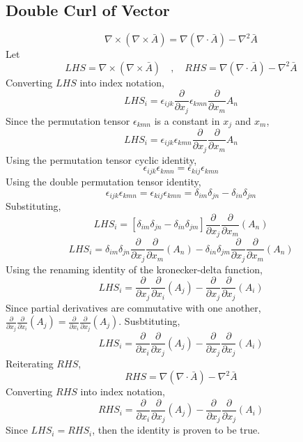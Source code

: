 \subsection{Double Curl of Vector}
\begin{comment}
\end{comment}

$$\nabla\times\left(\nabla\times\bar{A}\right) = \nabla\left(\nabla \cdot\bar{A}\right) - \nabla^{2}\bar{A}$$
Let 
$$LHS = \nabla\times\left(\nabla\times\bar{A}\right) \quad,\quad RHS = \nabla\left(\nabla \cdot\bar{A}\right) - \nabla^{2}\bar{A}$$
Converting $LHS$ into index notation,
$$LHS_{i} = \epsilon_{ijk}\frac{\partial}{\partial x_{j}}\epsilon_{kmn}\frac{\partial}{\partial x_{m}}A_{n}$$
Since the permutation tensor $\epsilon_{kmn}$ is a constant in $x_{j}$ and $x_{m}$,
$$LHS_{i} = \epsilon_{ijk}\epsilon_{kmn}\frac{\partial}{\partial x_{j}}\frac{\partial}{\partial x_{m}}A_{n}$$
Using the permutation tensor cyclic identity,
$$\epsilon_{ijk}\epsilon_{kmn} = \epsilon_{kij}\epsilon_{kmn}$$
Using the double permutation tensor identity,
$$\epsilon_{ijk}\epsilon_{kmn} = \epsilon_{kij}\epsilon_{kmn} = \delta_{im}\delta_{jn}-\delta_{in}\delta_{jm}$$
Substituting,
$$LHS_{i} = [\delta_{im}\delta_{jn}-\delta_{in}\delta_{jm}]\frac{\partial}{\partial x_{j}}\frac{\partial}{\partial x_{m}}(A_{n})$$
$$LHS_{i} =  \delta_{im}\delta_{jn}\frac{\partial}{\partial x_{j}}\frac{\partial}{\partial x_{m}}(A_{n})-\delta_{in}\delta_{jm}\frac{\partial}{\partial x_{j}}\frac{\partial}{\partial x_{m}}(A_{n}) $$
Using the renaming identity of the kronecker-delta function,
$$LHS_{i} =  \frac{\partial}{\partial x_{j}}\frac{\partial}{\partial x_{i}}(A_{j}) - \frac{\partial}{\partial x_{j}}\frac{\partial}{\partial x_{j}}(A_{i}) $$
Since partial derivatives are commutative with one another, $\displaystyle \frac{\partial}{\partial x_{j}}\frac{\partial}{\partial x_{i}}(A_{j}) = \frac{\partial}{\partial x_{i}}\frac{\partial}{\partial x_{j}}(A_{j})$. Susbtituting,
$$LHS_{i} = \frac{\partial}{\partial x_{i}}\frac{\partial}{\partial x_{j}}(A_{j}) - \frac{\partial}{\partial x_{j}}\frac{\partial}{\partial x_{j}}(A_{i}) $$
Reiterating $RHS$,
$$RHS = \nabla\left(\nabla \cdot\bar{A}\right) - \nabla^{2}\bar{A}$$
Converting $RHS$ into index notation,
$$RHS_{i} = \frac{\partial}{\partial x_{i}}\frac{\partial}{\partial x_{j}}(A_{j}) - \frac{\partial}{\partial x_{j}}\frac{\partial}{\partial x_{j}}(A_{i})$$
Since $LHS_{i} = RHS_{i}$, then the identity is proven to be true.

